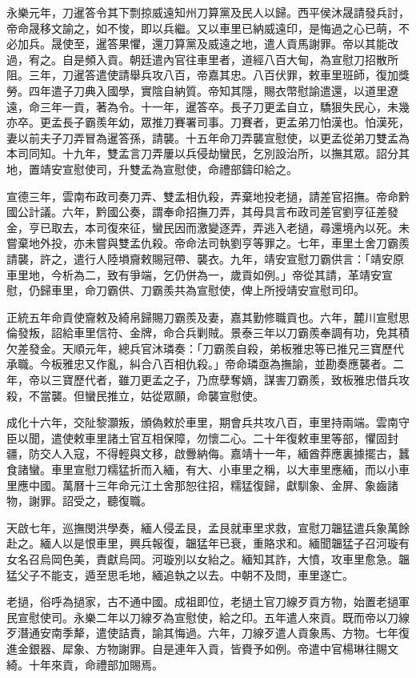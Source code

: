 \begin{pinyinscope}
永樂元年，刀暹答令其下剽掠威遠知州刀算黨及民人以歸。西平侯沐晟請發兵討，帝命晟移文諭之，如不悛，即以兵繼。又以車里已納威遠印，是悔過之心已萌，不必加兵。晟使至，暹答果懼，還刀算黨及威遠之地，遣人貢馬謝罪。帝以其能改過，宥之。自是頻入貢。朝廷遣內官往車里者，道經八百大甸，為宣慰刀招散所阻。三年，刀暹答遣使請舉兵攻八百，帝嘉其忠。八百伏罪，敕車里班師，復加獎勞。四年遣子刀典入國學，實陰自納質。帝知其隱，賜衣幣慰諭遣還，以道里遼遠，命三年一貢，著為令。十一年，暹答卒。長子刀更孟自立，驕狠失民心，未幾亦卒。更孟長子霸羨年幼，眾推刀賽署司事。刀賽者，更孟弟刀怕漢也。怕漢死，妻以前夫子刀弄冒為暹答孫，請襲。十五年命刀弄襲宣慰使，以更孟從弟刀雙孟為本司同知。十九年，雙孟言刀弄屢以兵侵劫蠻民，乞別設治所，以撫其眾。詔分其地，置靖安宣慰使司，升雙孟為宣慰使，命禮部鑄印給之。

宣德三年，雲南布政司奏刀弄、雙孟相仇殺，弄棄地投老撾，請差官招撫。帝命黔國公計議。六年，黔國公奏，謂奉命招撫刀弄，其母具言布政司差官劉亨征差發金，亨已取去，本司復來征，蠻民因而激變逐弄，弄逃入老撾，尋還境內以死。未嘗棄地外投，亦未嘗與雙孟仇殺。帝命法司執劉亨等罪之。七年，車里土舍刀霸羨請襲，許之，遣行人陸塤齎敕賜冠帶、襲衣。九年，靖安宣慰刀霸供言：「靖安原車里地，今析為二，致有爭端，乞仍併為一，歲貢如例。」帝從其請，革靖安宣慰，仍歸車里，命刀霸供、刀霸羨共為宣慰使，俾上所授靖安宣慰司印。

正統五年命貢使齎敕及綺帛歸賜刀霸羨及妻，嘉其勤修職貢也。六年，麓川宣慰思倫發叛，詔給車里信符、金牌，命合兵剿賊。景泰三年以刀霸羨奉調有功，免其積欠差發金。天順元年，總兵官沐璘奏：「刀霸羨自殺，弟板雅忠等已推兄三寶歷代承職。今板雅忠又作亂，糾合八百相仇殺。」帝命璘亟為撫諭，並勘奏應襲者。二年，帝以三寶歷代者，雖刀更孟之子，乃庶孽奪嫡，謀害刀霸羨，致板雅忠借兵攻殺，不當襲。但蠻民推立，姑從眾願，命襲宣慰使。

成化十六年，交阯黎灝叛，頒偽敕於車里，期會兵共攻八百，車里持兩端。雲南守臣以聞，遣使敕車里諸土官互相保障，勿懷二心。二十年復敕車里等部，懼固封疆，防交人入寇，不得輕與文移，啟釁納侮。嘉靖十一年，緬酋莽應裏據擺古，蠶食諸蠻。車里宣慰刀糯猛折而入緬，有大、小車里之稱，以大車里應緬，而以小車里應中國。萬曆十三年命元江土舍那恕往招，糯猛復歸，獻馴象、金屏、象齒諸物，謝罪。詔受之，聽復職。

天啟七年，巡撫閔洪學奏，緬人侵孟艮，孟艮就車里求救，宣慰刀韞猛遣兵象萬餘赴之。緬人以是恨車里，興兵報復，韞猛年已衰，重賂求和。緬聞韞猛子召河璇有女名召烏岡色美，責獻烏岡。河璇別以女紿之。緬知其詐，大憤，攻車里愈急。韞猛父子不能支，遁至思毛地，緬追執之以去。中朝不及問，車里遂亡。

老撾，俗呼為撾家，古不通中國。成祖即位，老撾土官刀線歹貢方物，始置老撾軍民宣慰使司。永樂二年以刀線歹為宣慰使，給之印。五年遣人來貢。既而帝以刀線歹潛通安南季犛，遣使詰責，諭其悔過。六年，刀線歹遣人貢象馬、方物。七年復進金銀器、犀象、方物謝罪。自是連年入貢，皆賚予如例。帝遣中官楊琳往賜文綺。十年來貢，命禮部加賜焉。


\end{pinyinscope}
